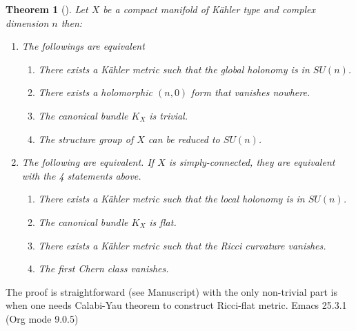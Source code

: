 \documentclass[11pt]{article}
\newtheorem{theorem}{Theorem}
\begin{document}
\begin{theorem}[]
Let \(X\) be a compact manifold of Kähler type and complex dimension \(n\) then:
\begin{enumerate}
\item The followings are equivalent
\begin{enumerate}
\item There exists a Kähler metric such that the global holonomy is in \(SU(n)\).
\item There exists a holomorphic \((n,0)\) form that vanishes nowhere.
\item The canonical bundle \(K_X\) is trivial.
\item The structure group of \(X\) can be reduced to \(SU(n)\).
\end{enumerate}
\item The following are equivalent. If \(X\) is simply-connected, they are equivalent with the 4
statements above.
\begin{enumerate}
\item There exists a Kähler metric such that the local holonomy is in \(SU(n)\).
\item The canonical bundle \(K_X\) is flat.
\item There exists a Kähler metric such that the Ricci curvature vanishes.
\item The first Chern class vanishes.
\end{enumerate}
\end{enumerate}
\end{theorem}

The proof is straightforward (see Manuscript) with the only non-trivial part is when one needs Calabi-Yau theorem to
construct Ricci-flat metric.
Emacs 25.3.1 (Org mode 9.0.5)
\end{document}
